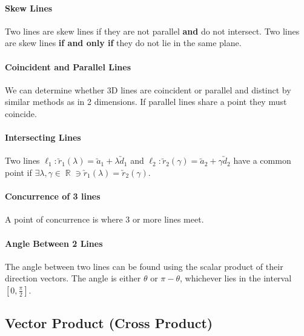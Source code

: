 \documentclass[a4paper,twoside]{article}
\DeclareMathOperator\R{\mathbb{R}}
\begin{document}
				\paragraph{Skew Lines} Two lines are skew lines if they are not parallel \textbf{and} do not intersect. Two lines are skew lines \textbf{if and only if} they do not lie in the same plane.
				
				\paragraph{Coincident and Parallel Lines} We can determine whether 3D lines are coincident or parallel and distinct by similar methods as in 2 dimensions. If parallel lines share a point they must coincide.
				
				\paragraph{Intersecting Lines} Two lines $\ell_1:\utilde{r}_1(\lambda)=\utilde{a}_1+\lambda\utilde{d}_1$ and $\ell_2:\utilde{r}_2(\gamma)=\utilde{a}_2+\gamma\utilde{d}_2$ have a common point if $\exists\lambda,\gamma\in\R\ni\utilde{r}_1(\lambda)=\utilde{r}_2(\gamma)$.
				
				\paragraph{Concurrence of 3 lines} A point of concurrence is where 3 or more lines meet.
				
				\paragraph{Angle Between 2 Lines} The angle between two lines can be found using the scalar product of their direction vectors. The angle is either $\theta$ or $\pi-\theta$, whichever lies in the interval $[0,\frac{\pi}{2}]$.
		\subsection{Vector Product (Cross Product)}
\end{document}
